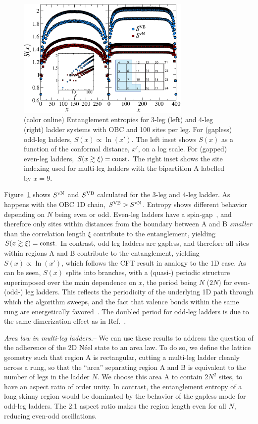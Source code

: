 \documentclass[prl,aps,twocolumn,floatfix,amsmath,amssymb,superscriptaddress,tightenlines]{revtex4}
\begin{document}
\begin{figure} { \includegraphics[width=3.3in]{FIG23NEW.eps}
\caption{(color online) Entanglement entropies for 3-leg (left)
and 4-leg (right) ladder systems with OBC and 100 sites per leg.  For
(gapless) odd-leg ladders, $S(x)\propto\ln(x')$.  The left
inset shows $S(x)$ as a function of the conformal distance, $x'$, on a log
scale. For (gapped) even-leg ladders, $S(x\gtrsim\xi)= {\rm const}.$
The right inset shows the site indexing used for multi-leg ladders with the
bipartition A labelled by $x=9$.  \label{ladder} }} \end{figure}

Figure~\ref{ladder} shows $S^{ \rm vN}$ and $S^{\rm VB}$ calculated for
the 3-leg and 4-leg ladder. As happens with the OBC 1D chain, $S^{\rm VB}
> S^{ \rm vN}$.  
Entropy shows different behavior depending on $N$ being even or odd.
Even-leg ladders have a spin-gap~\cite{White1994}, and therefore only
sites within distances from the boundary between A and B {\it smaller}
than the correlation length $\xi$ contribute to the entanglement, yielding
$S(x\gtrsim \xi)= {\rm const}.$ In contrast, odd-leg ladders are gapless,
and therefore all sites within regions A and B contribute to the
entanglement, yielding $S(x)\propto\ln(x')$, which follows the CFT result
in analogy to the 1D case. As can be seen, $S(x)$ splits into branches,
with a (quasi-) periodic structure superimposed over the main dependence
on $x$, the period being $N$ ($2N$) for even- (odd-) leg ladders. This
reflects the periodicity of the underlying 1D path through which the
algorithm sweeps, and the fact that valence bonds within the same rung are
energetically favored~\cite{White1994}. The doubled period for odd-leg
ladders is due to the same dimerization effect as in Ref.~\cite{Ian1}.

{\it Area law in multi-leg ladders.}--  
We can use these results to address the question of the adherence of the 2D N\'eel state
to an area law.  To do so, we
define the lattice
geometry such that region A is rectangular, cutting a multi-leg ladder
cleanly across a rung, so that the ``area'' separating region A and B is
equivalent to the number of legs in the ladder $N$.  We choose this area A
to contain $2N^2$ sites, to have an aspect ratio of order unity.  In
contrast, the entanglement entropy of a long
skinny region would be dominated by the behavior
of the gapless mode for odd-leg ladders.
The 2:1 aspect ratio makes the region length even for all $N$, reducing even-odd oscillations.
\end{document}
